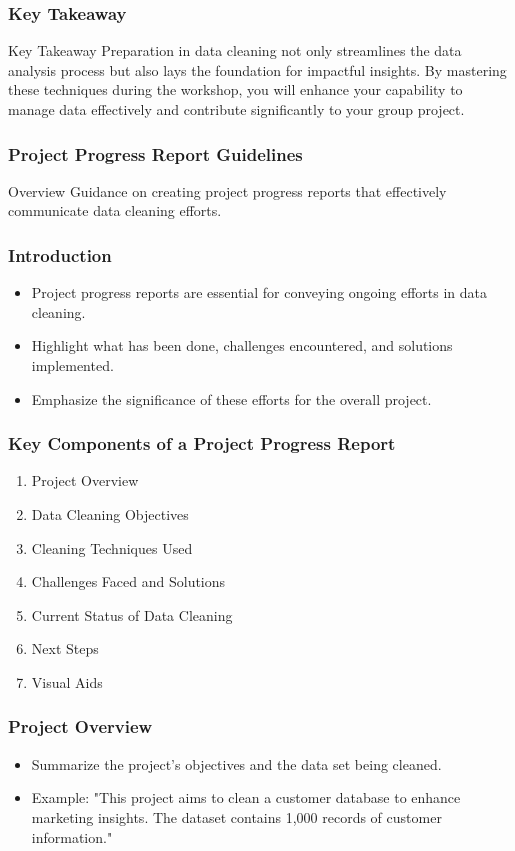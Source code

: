 \documentclass[aspectratio=169]{beamer}
\begin{document}
\begin{frame}[fragile]
    \frametitle{Key Takeaway}
    \begin{block}{Key Takeaway}
        Preparation in data cleaning not only streamlines the data analysis process but also lays the foundation for impactful insights. By mastering these techniques during the workshop, you will enhance your capability to manage data effectively and contribute significantly to your group project.
    \end{block}
\end{frame}

\begin{frame}
    \frametitle{Project Progress Report Guidelines}
    \begin{block}{Overview}
        Guidance on creating project progress reports that effectively communicate data cleaning efforts.
    \end{block}
\end{frame}

\begin{frame}
    \frametitle{Introduction}
    \begin{itemize}
        \item Project progress reports are essential for conveying ongoing efforts in data cleaning.
        \item Highlight what has been done, challenges encountered, and solutions implemented.
        \item Emphasize the significance of these efforts for the overall project.
    \end{itemize}
\end{frame}

\begin{frame}
    \frametitle{Key Components of a Project Progress Report}
    \begin{enumerate}
        \item Project Overview
        \item Data Cleaning Objectives
        \item Cleaning Techniques Used
        \item Challenges Faced and Solutions
        \item Current Status of Data Cleaning
        \item Next Steps
        \item Visual Aids
    \end{enumerate}
\end{frame}

\begin{frame}[fragile]
    \frametitle{Project Overview}
    \begin{itemize}
        \item Summarize the project's objectives and the data set being cleaned.
        \item Example: "This project aims to clean a customer database to enhance marketing insights. The dataset contains 1,000 records of customer information."
    \end{itemize}
\end{frame}
\end{document}

